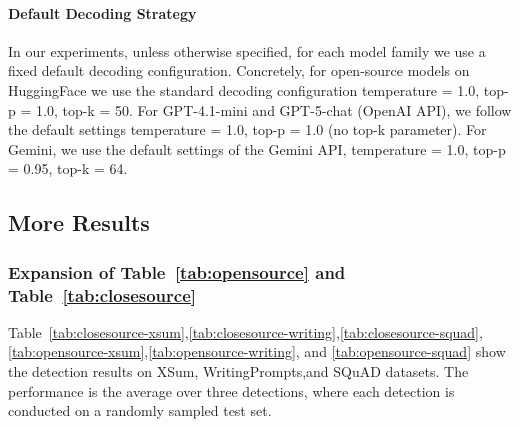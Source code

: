 \documentclass{article}
\theoremstyle{plain}
\theoremstyle{definition}
\theoremstyle{remark}
\begin{document}
\paragraph{Default Decoding Strategy}
In our experiments, unless otherwise specified, for each model family we use a fixed default decoding configuration. Concretely, for open-source models on HuggingFace we use the standard decoding configuration temperature = 1.0, top-p = 1.0, top-k = 50. For GPT-4.1-mini and GPT-5-chat (OpenAI API), we follow the default settings temperature = 1.0, top-p = 1.0 (no top-k parameter). For Gemini, we use the default settings of the Gemini API, temperature = 1.0, top-p = 0.95, top-k = 64.

\subsection{More Results}
\subsubsection{Expansion of Table~\ref{tab:opensource} and Table~\ref{tab:closesource}}

Table~\ref{tab:closesource-xsum},\ref{tab:closesource-writing},\ref{tab:closesource-squad},
\ref{tab:opensource-xsum},\ref{tab:opensource-writing}, and \ref{tab:opensource-squad} show the detection results on XSum, WritingPrompts,and SQuAD datasets. The performance is the average over three detections, where each detection is conducted on a randomly sampled test set.
\end{document}
